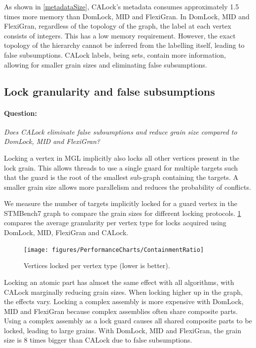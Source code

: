 As shown in \cref{metadataSize}, CALock's metadata consumes approximately 1.5 times more memory than DomLock, MID and FlexiGran.
In DomLock, MID and FlexiGran, regardless of the topology of the graph, the label at each vertex consists of integers.
This has a low memory requirement. However, the exact topology of the hierarchy cannot be inferred from the labelling itself, leading to false subsumptions.
CALock labels, being sets, contain more information, allowing for smaller grain sizes and eliminating false subsumptions.



\subsection{Lock granularity and false subsumptions}\label{benchmark:falseSubsumption}

\paragraph{Question:} \emph{Does CALock eliminate false subsumptions and reduce grain size compared to DomLock, MID and FlexiGran?}

Locking a vertex in MGL implicitly also locks all other vertices present in the lock grain. This allows threads to use a single guard for multiple targets such that the guard is the root of the smallest sub-graph containing the targets. A smaller grain size allows more parallelism and reduces the probability of conflicts. 

We measure the number of targets implicitly locked for a guard vertex in the STMBench7 graph to compare the grain sizes for different locking protocols. 
\cref{nodesLockedPerNodeType} compares the average granularity per vertex type for locks acquired using DomLock, MID, FlexiGran and CALock.

\begin{figure}[h]
	\centering
	\captionsetup{justification=centering}
	\texttt{[image: figures/PerformanceCharts/ContainmentRatio]}
	\caption{Vertices locked per vertex type (lower is better).}
	\label{nodesLockedPerNodeType}
\end{figure}

Locking an atomic part has almost the same effect with all algorithms, with CALock marginally reducing grain sizes. 
When locking higher up in the graph, the effects vary. 
Locking a complex assembly is more expensive with DomLock, MID and FlexiGran because complex assemblies often share composite parts. Using a complex assembly as a lock guard causes all shared composite parts to be locked, leading to large grains. With DomLock, MID and FlexiGran, the grain size is 8 times bigger than CALock due to false subsumptions. 

